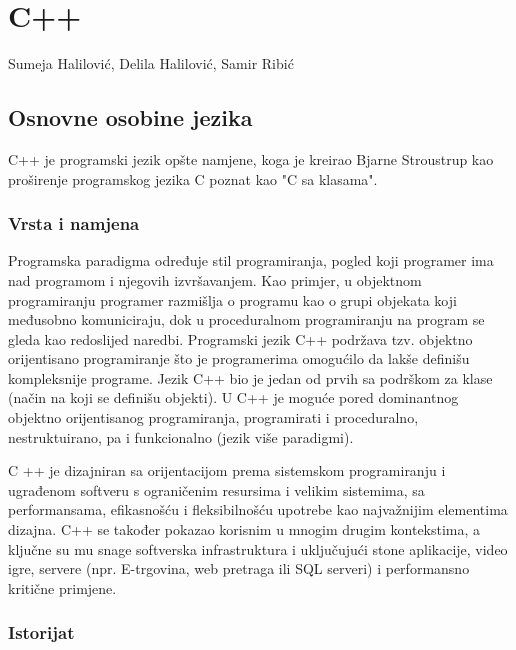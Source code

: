 \documentclass[11pt]{book}
\begin{document}
\setcounter{chapter}{75}
\setcounter{page}{2074}

\lstset {language=C++}
\chapter{C++}
\begin{center}
  Sumeja Halilović, Delila Halilović, Samir Ribić
\end{center}

\section{Osnovne osobine jezika}
C++ je programski jezik opšte namjene, koga je kreirao Bjarne Stroustrup kao proširenje programskog jezika C poznat kao "C sa klasama".

\subsection{Vrsta i namjena}

Programska  paradigma određuje  stil programiranja,  pogled  koji programer ima nad programom i njegovih izvršavanjem. Kao primjer, u objektnom programiranju programer razmišlja  o  programu kao o grupi objekata koji međusobno komuniciraju,  dok  u proceduralnom programiranju na program  se gleda  kao  redoslijed  naredbi.  Programski  jezik  C++ podržava  tzv. objektno  orijentisano  programiranje  što  je programerima  omogućilo  da  lakše  definišu kompleksnije programe. Jezik C++ bio je jedan od prvih sa podrškom za klase (način na koji se  definišu  objekti).  U  C++  je  moguće  pored  dominantnog  objektno  orijentisanog programiranja,  programirati  i  proceduralno,  nestruktuirano,  pa  i  funkcionalno  (jezik  više paradigmi).

C ++ je dizajniran sa orijentacijom prema sistemskom programiranju i ugrađenom softveru s ograničenim resursima i velikim sistemima, sa performansama, efikasnošću i fleksibilnošću upotrebe kao najvažnijim elementima dizajna.  C++ se također pokazao korisnim u mnogim drugim kontekstima, a ključne su mu snage softverska infrastruktura i uključujući stone aplikacije, video igre, servere (npr. E-trgovina, web pretraga ili SQL serveri) i performansno kritične primjene.

\subsection{Istorijat}
\end{document}
